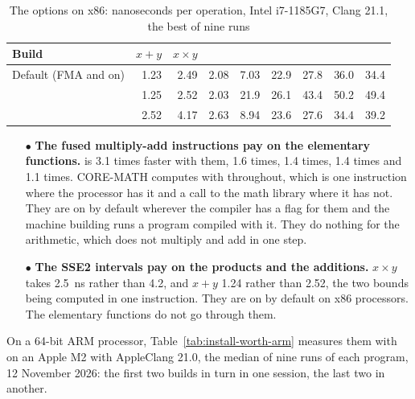 \begin{table}[htbp]
  \centering\renewcommand{\arraystretch}{1.1}\footnotesize
  \setlength{\tabcolsep}{4pt}
  \caption{The options on x86: nanoseconds per operation, Intel i7-1185G7, Clang 21.1, the best of nine runs} \label{tab:install-worth-x86}
  \begin{tabular}{L{3.3cm}rrrrrrrr}
    \hline
    Build & $x + y$ & $x \times y$ &  &  &
     &  &  & \\
    \hline\hline
    Default (FMA and  on) & 1.23 & 2.49 & 2.08 & 7.03 & 22.9 & 27.8 & 36.0 & 34.4\\
     & 1.25 & 2.52 & 2.03 & 21.9 & 26.1 & 43.4 & 50.2 & 49.4\\
     & 2.52 & 4.17 & 2.63 & 8.94 & 23.6 & 27.6 & 34.4 & 39.2\\
    \hline
  \end{tabular}

\end{table}

\begin{itemize}
\item[$\bullet$] \textbf{The fused multiply-add instructions pay on the elementary
  functions.}  is 3.1 times faster with them,  1.6 times,  1.4 times,  1.4 times and  1.1 times. CORE-MATH computes with 
  throughout, which is one instruction where the processor has it and a call
  to the math library where it has not. They are on by default wherever the
  compiler has a flag for them and the machine building runs a program
  compiled with it. They do nothing for the arithmetic, which does not
  multiply and add in one step.\newinvfive
\item[$\bullet$] \textbf{The SSE2 intervals pay on the products and the
  additions.} $x \times y$ takes 2.5~ns rather than 4.2, and $x + y$ 1.24 rather than 2.52, the two bounds being computed in one instruction. They
  are on by default on x86 processors. The elementary functions do not go
  through them.
\end{itemize}

\medskip
On a 64-bit ARM processor, Table~\ref{tab:install-worth-arm} measures them
with  on an Apple M2 with AppleClang 21.0, the median of nine runs of each program, 12 November 2026: the first two builds in turn in one session,
the last two in another.

